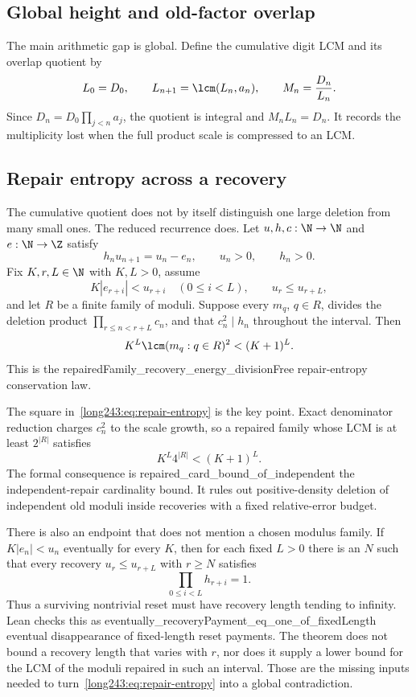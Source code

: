 \documentclass[11pt]{article}
\begin{document}
\subsection{Global height and old-factor overlap}

The main arithmetic gap is global.  Define the cumulative digit LCM and its
overlap quotient by
\[
 L_0=D_0,\qquad L_{n+1}=\lcm(L_n,a_n),\qquad M_n=\frac{D_n}{L_n}.
\]
Since $D_n=D_0\prod_{j<n}a_j$, the quotient is integral and
$M_nL_n=D_n$.  It records the multiplicity lost when the full product scale
is compressed to an LCM.

\subsection{Repair entropy across a recovery}

The cumulative quotient does not by itself distinguish one large deletion
from many small ones.  The reduced recurrence does.  Let $u,h,c:\N\to\N$ and
$e:\N\to\Z$ satisfy
\[
 h_nu_{n+1}=u_n-e_n,
 \qquad u_n>0,
 \qquad h_n>0.
\]
Fix $K,r,L\in\N$ with $K,L>0$, assume
\[
 K|e_{r+i}|<u_{r+i}\quad(0\le i<L),
 \qquad u_r\le u_{r+L},
\]
and let $R$ be a finite family of moduli.  Suppose every $m_q$, $q\in R$,
divides the deletion product $\prod_{r\le n<r+L}c_n$, and that
$c_n^2\mid h_n$ throughout the interval.  Then
\begin{equation}\label{long243:eq:repair-entropy}
 K^L\lcm(m_q:q\in R)^2<(K+1)^L.
\end{equation}
This is the
      {repairedFamily_recovery_energy_divisionFree}
      {repair-entropy conservation law}.

The square in~\eqref{long243:eq:repair-entropy} is the key point.  Exact denominator
reduction charges $c_n^2$ to the scale growth, so a repaired family whose LCM
is at least $2^{|R|}$ satisfies
\[
 K^L4^{|R|}<(K+1)^L.
\]
The formal consequence is
      {repaired_card_bound_of_independent}
      {the independent-repair cardinality bound}.
It rules out positive-density deletion of independent old moduli inside
recoveries with a fixed relative-error budget.

There is also an endpoint that does not mention a chosen modulus family.  If
$K|e_n|<u_n$ eventually for every $K$, then for each fixed $L>0$ there is an
$N$ such that every recovery $u_r\le u_{r+L}$ with $r\ge N$ satisfies
\[
 \prod_{0\le i<L}h_{r+i}=1.
\]
Thus a surviving nontrivial reset must have recovery length tending to
infinity.  Lean checks this as
      {eventually_recoveryPayment_eq_one_of_fixedLength}
      {eventual disappearance of fixed-length reset payments}.
The theorem does not bound a recovery length that varies with $r$, nor does it
supply a lower bound for the LCM of the moduli repaired in such an interval.
Those are the missing inputs needed to turn~\eqref{long243:eq:repair-entropy} into a
global contradiction.
\end{document}
